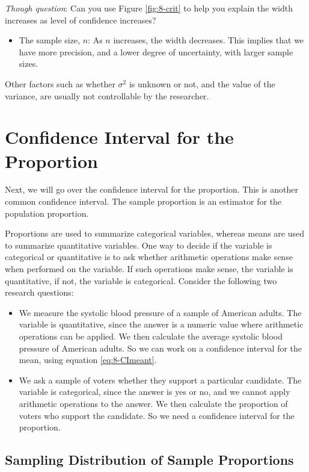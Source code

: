 \documentclass[
]{book}
\providecommand{\tightlist}{%
  \setlength{\itemsep}{0pt}\setlength{\parskip}{0pt}}
\begin{document}
\emph{Though question}: Can you use Figure \ref{fig:8-crit} to help you explain the width increases as level of confidence increases?

\begin{itemize}
\tightlist
\item
  The sample size, \(n\): As \(n\) increases, the width decreases. This implies that we have more precision, and a lower degree of uncertainty, with larger sample sizes.
\end{itemize}

Other factors such as whether \(\sigma^2\) is unknown or not, and the value of the variance, are usually not controllable by the researcher.

\hypertarget{CIprop}{%
\section{Confidence Interval for the Proportion}\label{CIprop}}

Next, we will go over the confidence interval for the proportion. This is another common confidence interval. The sample proportion is an estimator for the population proportion.

Proportions are used to summarize categorical variables, whereas means are used to summarize quantitative variables. One way to decide if the variable is categorical or quantitative is to ask whether arithmetic operations make sense when performed on the variable. If such operations make sense, the variable is quantitative, if not, the variable is categorical. Consider the following two research questions:

\begin{itemize}
\item
  We measure the systolic blood pressure of a sample of American adults. The variable is quantitative, since the answer is a numeric value where arithmetic operations can be applied. We then calculate the average systolic blood pressure of American adults. So we can work on a confidence interval for the mean, using equation \eqref{eq:8-CImeant}.
\item
  We ask a sample of voters whether they support a particular candidate. The variable is categorical, since the answer is yes or no, and we cannot apply arithmetic operations to the answer. We then calculate the proportion of voters who support the candidate. So we need a confidence interval for the proportion.
\end{itemize}

\hypertarget{sampdistprops}{%
\subsection{Sampling Distribution of Sample Proportions}\label{sampdistprops}}
\end{document}
